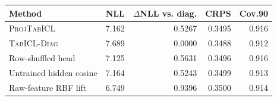 \begin{tabular}{lrrrr}
\toprule Method & NLL & $\Delta$NLL vs. diag. & CRPS & Cov.90 \\
\midrule
\textsc{ProjTabICL} & 7.162 & 0.5267 & 0.3495 & 0.916 \\
\textsc{TabICL-Diag} & 7.689 & 0.0000 & 0.3488 & 0.912 \\
Row-shuffled head & 7.125 & 0.5631 & 0.3496 & 0.916 \\
Untrained hidden cosine & 7.164 & 0.5243 & 0.3499 & 0.913 \\
Raw-feature RBF lift & 6.749 & 0.9396 & 0.3500 & 0.914 \\
\bottomrule
\end{tabular}
